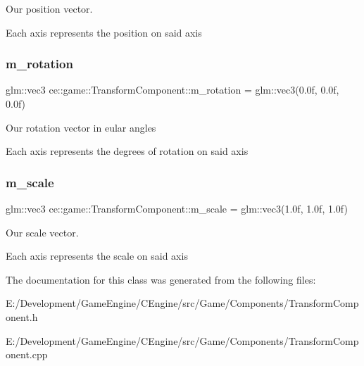 Our position vector. 

Each axis represents the position on said axis \mbox{\label{classce_1_1game_1_1_transform_component_aacf1e75e976c54bb503448b6da534f63}} 
\subsubsection{\texorpdfstring{m\+\_\+rotation}{m\_rotation}}
{\footnotesize\ttfamily glm\+::vec3 ce\+::game\+::\+Transform\+Component\+::m\+\_\+rotation = glm\+::vec3(0.\+0f, 0.\+0f, 0.\+0f)\hspace{0.3cm}{\ttfamily [protected]}}

Our rotation vector in eular angles

Each axis represents the degrees of rotation on said axis \mbox{\label{classce_1_1game_1_1_transform_component_af120345110ceff7bcf3b40d2ac1b0575}} 
\subsubsection{\texorpdfstring{m\+\_\+scale}{m\_scale}}
{\footnotesize\ttfamily glm\+::vec3 ce\+::game\+::\+Transform\+Component\+::m\+\_\+scale = glm\+::vec3(1.\+0f, 1.\+0f, 1.\+0f)\hspace{0.3cm}{\ttfamily [protected]}}



Our scale vector. 

Each axis represents the scale on said axis 

The documentation for this class was generated from the following files\+:\begin{DoxyCompactItemize}
\item 
E\+:/\+Development/\+Game\+Engine/\+C\+Engine/src/\+Game/\+Components/Transform\+Component.\+h\item 
E\+:/\+Development/\+Game\+Engine/\+C\+Engine/src/\+Game/\+Components/Transform\+Component.\+cpp\end{DoxyCompactItemize}
